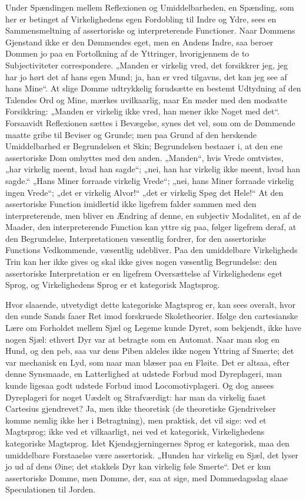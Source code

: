 \documentclass[12pt]{book}
\newcommand{\opage}[1]{\marginnote{\footnotesize\textit{[#1]}}}
\begin{document}
Under Spændingen mellem Reflexionen og Umiddelbarheden,
en Spænding, som her er betinget af Virkelighedens
egen Fordobling til Indre og Ydre, sees en Sammensmeltning
af assertoriske og interpreterende Functioner. Naar Dommens
Gjenstand ikke er den Dømmendes eget, men en Andens
Indre, saa beroer Dommen jo paa en Fortolkning af de
Yttringer, hvorigjennem de to Subjectiviteter correspondere.
„Manden er virkelig vred, det forsikkrer jeg, jeg har jo hørt
det af hans egen Mund; ja, han er vred tilgavns, det kan
jeg see af hans Mine“. At slige Domme udtrykkelig
forud\opage{193}sætte
en bestemt Udtydning af den Talendes Ord og Mine,
mærkes uvilkaarlig, naar En møder med den modsatte Forsikkring:
„Manden er virkelig ikke vred, han mener ikke Noget
med det“. Forsaavidt Reflexionen sættes i Bevægelse, synes
det vel, som om de Dømmende maatte gribe til Beviser og
Grunde; men paa Grund af den herskende Umiddelbarhed er
Begrundelsen et Skin; Begrundelsen bestaaer i, at den ene
assertoriske Dom ombyttes med den anden. „Manden“, hvis
Vrede omtvistes, „har virkelig meent, hvad han sagde“; „nei,
han har virkelig ikke meent, hvad han sagde.“ „Hans Miner
forraade virkelig Vrede“; „nei, hans Miner forraade virkelig
ingen Vrede“; „det er virkelig Alvor!“ „det er virkelig Spøg det
Hele!“ At den assertoriske Function imidlertid ikke ligefrem
falder sammen med den interpreterende, men bliver en Ændring
af denne, en subjectiv Modalitet, en af de Maader, den interpreterende
Function kan yttre sig paa, følger ligefrem deraf,
at den Begrundelse, Interpretationen væsentlig fordrer, for
den assertoriske Functions Vedkommende, væsentlig udebliver.
Paa den umiddelbare Virkeligheds Trin kan her ikke gives
og skal ikke gives nogen væsentlig Begrundelse: den assertoriske
Interpretation er en ligefrem Oversættelse af Virkelighedens
eget Sprog, og Virkelighedens Sprog er et kategorisk
Magtsprog.

Hvor slaaende, utvetydigt dette kategoriske Magtsprog er,
kan sees overalt, hvor den sunde Sands faaer Ret imod forskruede
Skoletheorier. Ifølge den cartesianske Lære om Forholdet
mellem Sjæl og Legeme kunde Dyret, som bekjendt,
ikke have nogen Sjæl: ethvert Dyr var at betragte som en
Automat. Naar man slog en Hund, og den peb, saa var
dens Piben aldeles ikke nogen Yttring af Smerte; det var
mechanisk en Lyd, som naar man blæser paa en Fløite. Det
er altsaa, efter denne Synsmaade, en Latterlighed at udstede
Forbud mod Dyreplageri, man kunde ligesaa godt udstede
Forbud imod Locomotivplageri. Og dog ansees Dyreplageri
\opage{194}for noget Uædelt og Strafværdigt: har man da virkelig faaet
Cartesius gjendrevet? Ja, men ikke theoretisk (de theoretiske
Gjendrivelser komme nemlig ikke her i Betragtning), men
praktisk, det vil sige: ved et Magtsprog; ikke ved et vilkaarligt,
nei ved et kategorisk, Virkelighedens kategoriske Magtsprog.
Idet Kjendsgjerningernes Sprog er kategorisk, maa den umiddelbare
Forstaaelse være assertorisk. „Hunden har virkelig en
Sjæl, det lyser jo ud af dens Øine; det stakkels Dyr kan
virkelig føle Smerte“. Det er kun assertoriske Domme, men
Domme, der, saa at sige, med Dommedagsslag slaae Speculationen
til Jorden.
\end{document}
